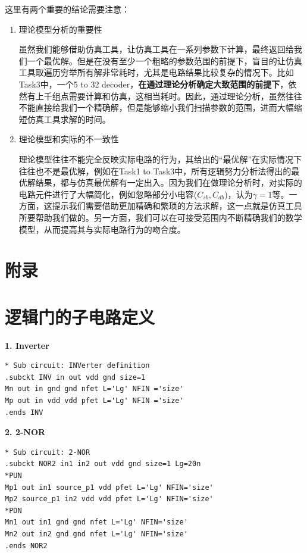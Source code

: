 \documentclass[UTF8,12pt,a4paper]{ctexart}
\begin{document}
这里有两个重要的结论需要注意：
\begin{enumerate}
    \item 理论模型分析的重要性
    
    虽然我们能够借助仿真工具，让仿真工具在一系列参数下计算，最终返回给我们一个最优解。但是在没有至少一个粗略的参数范围的前提下，盲目的让仿真工具取遍历穷举所有解非常耗时，尤其是电路结果比较复杂的情况下。比如Task3中，一个5 to 32 decoder，\textbf{在通过理论分析确定大致范围的前提下}，依然有上千组点需要计算和仿真，这相当耗时。因此，通过理论分析，虽然往往不能直接给我们一个精确解，但是能够缩小我们扫描参数的范围，进而大幅缩短仿真工具求解的时间。

    \item 理论模型和实际的不一致性

    理论模型往往不能完全反映实际电路的行为，其给出的“最优解”在实际情况下往往也不是最优解，例如在Task1 to Task3中，所有逻辑努力分析法得出的最优解结果，都与仿真最优解有一定出入。因为我们在做理论分析时，对实际的电路元件进行了大幅简化，例如忽略部分小电容($C_{sb}, C_{db}$)，认为$\gamma = 1$等。一方面，这提示我们需要借助更加精确和繁琐的方法求解，这一点就是仿真工具所要帮助我们做的。另一方面，我们可以在可接受范围内不断精确我们的数学模型，从而提高其与实际电路行为的吻合度。
\end{enumerate}

\clearpage
\appendix
\section*{附录}

\section{逻辑门的子电路定义}
\textbf{1. Inverter}
\begin{lstlisting}
* Sub circuit: INVerter definition
.subckt INV in out vdd gnd size=1
Mn out in gnd gnd nfet L='Lg' NFIN ='size'
Mp out in vdd vdd pfet L='Lg' NFIN ='size'
.ends INV
\end{lstlisting}

\textbf{2. 2-NOR}
\begin{lstlisting}
* Sub circuit: 2-NOR
.subckt NOR2 in1 in2 out vdd gnd size=1 Lg=20n
*PUN
Mp1 out in1 source_p1 vdd pfet L='Lg' NFIN='size'
Mp2 source_p1 in2 vdd vdd pfet L='Lg' NFIN='size'
*PDN
Mn1 out in1 gnd gnd nfet L='Lg' NFIN='size'
Mn2 out in2 gnd gnd nfet L='Lg' NFIN='size'
.ends NOR2
\end{lstlisting}
\end{document}
